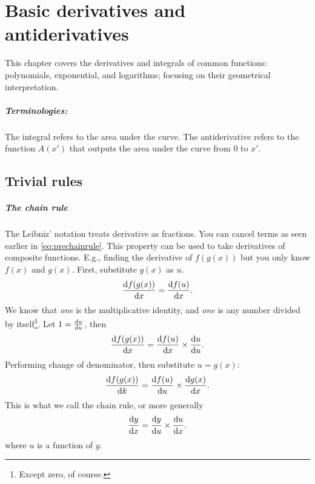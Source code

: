 \chapter{Basic derivatives and antiderivatives}
\label{sec:basic_derivatives_and_integrals}

This chapter covers the derivatives and integrals of common functions: polynomials, exponential, and logarithms; focusing on their geometrical interpretation.


\paragraph{Terminologies:} The integral refers to the area under the curve. The antiderivative refers to the function $A(x')$ that outputs the area under the curve from $0$ to $x'$.

\section{Trivial rules}
\label{sec:trivial_rules}

\paragraph{The chain rule} The Leibniz' notation treats derivative as fractions. You can cancel terms as seen earlier in \cref{eq:prechainrule}. This property can be used to take derivatives of composite functions. E.g., finding the derivative of $f(g(x))$ but you only know $f(x)$ and $g(x)$. First, substitute $g(x)$ as $u$.
\begin{equation*}
    \odv{f(g(x))}{x} = \odv{f(u)}{x}.
\end{equation*}
We know that \emph{one} is the multiplicative identity, and \emph{one} is any number divided by itself\footnote{Except zero, of course.}. Let $1 = \odv{u}{u}$, then
\begin{equation*}
    \odv{f(g(x))}{x} = \odv{f(u)}{x} \times \odv{u}{u}.
\end{equation*}
Performing change of denominator, then substitute $u = g(x)$:
\begin{equation*}
    \odv{f(g(x))}{k} = \odv{f(u)}{u} \times \odv{g(x)}{x}.
\end{equation*}
This is what we call the chain rule, or more generally
\begin{equation}
    \odv{y}{x} = \odv{y}{u} \times \odv{u}{x}. \label{eq:chainrule}
\end{equation}
where $u$ is a function of $y$.

